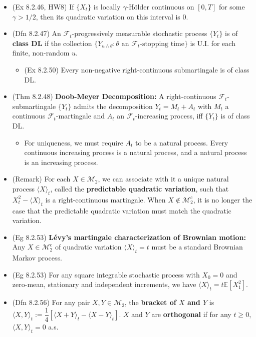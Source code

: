\documentclass[twoside]{article}
\newcommand\bbE{\mathbb{E}}
\newcommand\calF{\mathcal{F}}
\newcommand\calM{\mathcal{M}}
\def\t{\theta}
\begin{document}
\begin{itemize}
\item (Ex 8.2.46, HW8) If $\{ X_t\}$ is locally $\gamma$-H\"{o}lder continuous on $[0,T]$ for some $\gamma > 1/2$, then its quadratic variation on this interval is 0.

\item (Dfn 8.2.47) An $\calF_t$-progressively measurable stochastic process $\{Y_t \}$ is of \textbf{class DL} if the collection $\{ Y_{u \wedge \t}: \t \text{ an } \calF_t\text{-stopping time}\}$ is U.I. for each finite, non-random $u$.
\begin{itemize}
\item (Ex 8.2.50) Every non-negative right-continuous submartingale is of class DL.
\end{itemize}

\item (Thm 8.2.48) \textbf{Doob-Meyer Decomposition:} A right-continuous $\calF_t$-submartingale $\{Y_t\}$ admits the decomposition $Y_t = M_t + A_t$ with $M_t$ a continuous $\calF_t$-martingale and $A_t$ an $\calF_t$-increasing process, iff $\{ Y_t\}$ is of class DL.
\begin{itemize}
\item For uniqueness, we must require $A_t$ to be a natural process. Every continuous increasing process is a natural process, and a natural process is an increasing process.
\end{itemize}

\item (Remark) For each $X \in \calM_2$, we can associate with it a unique natural process $\langle X \rangle_t$, called the \textbf{predictable quadratic variation}, such that $X_t^2 - \langle X \rangle_t$ is a right-continuous martingale. When $X \notin \calM_2^c$, it is no longer the case that the predictable quadratic variation must match the quadratic variation.

\item (Eg 8.2.53) \textbf{L\'{e}vy's martingale characterization of Brownian motion:} Any $X \in \calM_2^c$ of quadratic variation $\langle X \rangle_t = t$ must be a standard Brownian Markov process.

\item (Eg 8.2.53) For any square integrable stochastic process with $X_0 = 0$ and zero-mean, stationary and independent increments, we have $\langle X \rangle_t = t \bbE [X_1^2]$.

\item (Dfn 8.2.56) For any pair $X, Y \in \calM_2$, the \textbf{bracket of $X$ and $Y$} is $\langle X, Y \rangle_t := \dfrac{1}{4} \left[\langle X + Y \rangle_t  - \langle X - Y \rangle_t \right]$. $X$ and $Y$ are \textbf{orthogonal} if for any $t \geq 0$, $\langle X, Y \rangle_t = 0$ a.s.


\end{itemize}
\end{document}
